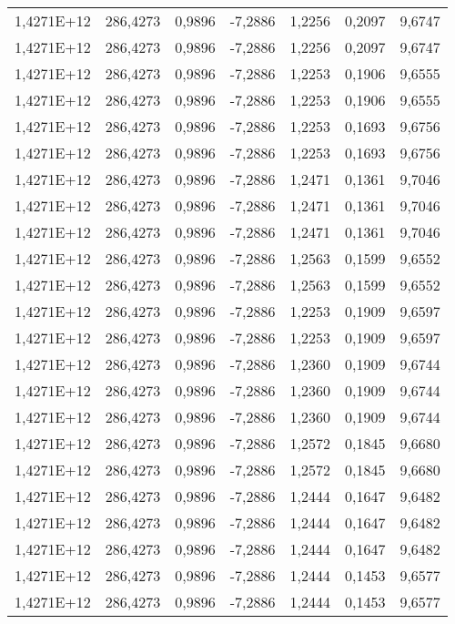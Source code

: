 \begin{table}[htbp]
\begin{tabular}{rrrrrrr}
    1,4271E+12 & 286,4273 & 0,9896 & -7,2886 & 1,2256 & 0,2097 & 9,6747 \\
    1,4271E+12 & 286,4273 & 0,9896 & -7,2886 & 1,2256 & 0,2097 & 9,6747 \\
    1,4271E+12 & 286,4273 & 0,9896 & -7,2886 & 1,2253 & 0,1906 & 9,6555 \\
    1,4271E+12 & 286,4273 & 0,9896 & -7,2886 & 1,2253 & 0,1906 & 9,6555 \\
    1,4271E+12 & 286,4273 & 0,9896 & -7,2886 & 1,2253 & 0,1693 & 9,6756 \\
    1,4271E+12 & 286,4273 & 0,9896 & -7,2886 & 1,2253 & 0,1693 & 9,6756 \\
    1,4271E+12 & 286,4273 & 0,9896 & -7,2886 & 1,2471 & 0,1361 & 9,7046 \\
    1,4271E+12 & 286,4273 & 0,9896 & -7,2886 & 1,2471 & 0,1361 & 9,7046 \\
    1,4271E+12 & 286,4273 & 0,9896 & -7,2886 & 1,2471 & 0,1361 & 9,7046 \\
    1,4271E+12 & 286,4273 & 0,9896 & -7,2886 & 1,2563 & 0,1599 & 9,6552 \\
    1,4271E+12 & 286,4273 & 0,9896 & -7,2886 & 1,2563 & 0,1599 & 9,6552 \\
    1,4271E+12 & 286,4273 & 0,9896 & -7,2886 & 1,2253 & 0,1909 & 9,6597 \\
    1,4271E+12 & 286,4273 & 0,9896 & -7,2886 & 1,2253 & 0,1909 & 9,6597 \\
    1,4271E+12 & 286,4273 & 0,9896 & -7,2886 & 1,2360 & 0,1909 & 9,6744 \\
    1,4271E+12 & 286,4273 & 0,9896 & -7,2886 & 1,2360 & 0,1909 & 9,6744 \\
    1,4271E+12 & 286,4273 & 0,9896 & -7,2886 & 1,2360 & 0,1909 & 9,6744 \\
    1,4271E+12 & 286,4273 & 0,9896 & -7,2886 & 1,2572 & 0,1845 & 9,6680 \\
    1,4271E+12 & 286,4273 & 0,9896 & -7,2886 & 1,2572 & 0,1845 & 9,6680 \\
    1,4271E+12 & 286,4273 & 0,9896 & -7,2886 & 1,2444 & 0,1647 & 9,6482 \\
    1,4271E+12 & 286,4273 & 0,9896 & -7,2886 & 1,2444 & 0,1647 & 9,6482 \\
    1,4271E+12 & 286,4273 & 0,9896 & -7,2886 & 1,2444 & 0,1647 & 9,6482 \\
    1,4271E+12 & 286,4273 & 0,9896 & -7,2886 & 1,2444 & 0,1453 & 9,6577 \\
    1,4271E+12 & 286,4273 & 0,9896 & -7,2886 & 1,2444 & 0,1453 & 9,6577 \\

\end{tabular}
\end{table}
